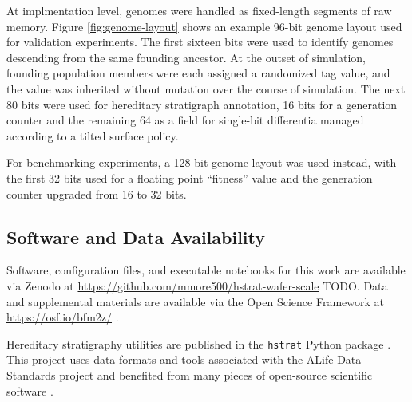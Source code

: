 


At implmentation level, genomes were handled as fixed-length segments of raw memory.
Figure \ref{fig:genome-layout} shows an example 96-bit genome layout used for validation experiments.
The first sixteen bits were used to identify genomes descending from the same founding ancestor.
At the outset of simulation, founding population members were each assigned a randomized tag value, and the value was inherited without mutation over the course of simulation.
The next 80 bits were used for hereditary stratigraph annotation, 16 bits for a generation counter and the remaining 64 as a field for single-bit differentia managed according to a tilted surface policy.

For benchmarking experiments, a 128-bit genome layout was used instead, with the first 32 bits used for a floating point ``fitness'' value and the generation counter upgraded from 16 to 32 bits.

\subsection{Software and Data Availability}

Software, configuration files, and executable notebooks for this work are available via Zenodo at \url{https://github.com/mmore500/hstrat-wafer-scale} TODO.
Data and supplemental materials are available via the Open Science Framework at \url{https://osf.io/bfm2z/} \citep{foster2017open}.

Hereditary stratigraphy utilities are published in the \texttt{hstrat} Python package \citep{moreno2022hstrat}.
This project uses data formats and tools associated with the ALife Data Standards project \citep{lalejini2019data} and benefited from many pieces of open-source scientific software \citep{sand2014tqdist,2020SciPy-NMeth,harris2020array,reback2020pandas,mckinney-proc-scipy-2010,sukumaran2010dendropy,cock2009biopython,dolson2024phylotrackpy,torchiano2016effsize,waskom2021seaborn,hunter2007matplotlib,moreno2024apc,moreno2023teeplot,torchiano2016effsize,moreno2024pecking,moreno2024joinem,moreno2024hsurf,moreno2024wse}. %

